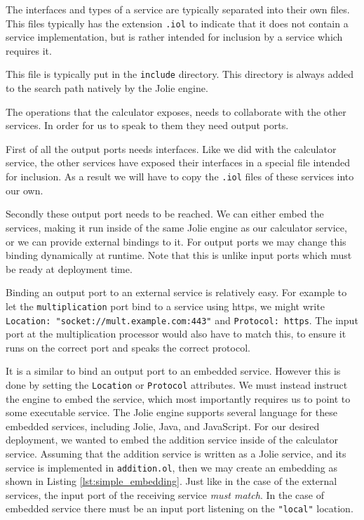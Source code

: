 \begin{observation}
    The interfaces and types of a service are typically separated into their
    own files. This files typically has the extension \verb!.iol! to indicate
    that it does not contain a service implementation, but is rather intended
    for inclusion by a service which requires it.

    This file is typically put in the \verb!include! directory. This directory
    is always added to the search path natively by the Jolie engine.
\end{observation}

The operations that the calculator exposes, needs to collaborate with the other
services. In order for us to speak to them they need output ports.

First of all the output ports needs interfaces. Like we did with the calculator
service, the other services have exposed their interfaces in a special file
intended for inclusion. As a result we will have to copy the
\texttt{.iol} files of these services into our own.

Secondly these output port needs to be reached. We can either embed the
services, making it run inside of the same Jolie engine as our calculator
service, or we can provide external bindings to it. For output ports we may
change this binding dynamically at runtime. Note that this is unlike input
ports which must be ready at deployment time.

Binding an output port to an external service is relatively easy. For example
to let the \verb!multiplication! port bind to a service using https, we might
write \texttt{Location: "socket://mult.example.com:443"} and
\texttt{Protocol: https}. The input port at the multiplication processor
would also have to match this, to ensure it runs on the correct port and speaks
the correct protocol.

It is a similar to bind an output port to an embedded service. However this is
done by setting the \texttt{Location} or \texttt{Protocol}
attributes. We must instead instruct the engine to embed the service, which
most importantly requires us to point to some executable service. The Jolie
engine supports several language for these embedded services, including Jolie,
Java, and JavaScript. For our desired deployment, we wanted to embed the
addition service inside of the calculator service. Assuming that the addition
service is written as a Jolie service, and its service is implemented in
\texttt{addition.ol}, then we may create an embedding as shown in
Listing \ref{lst:simple_embedding}. Just like in the case of the external
services, the input port of the receiving service \emph{must match}. In the
case of embedded service there must be an input port listening on the
\texttt{"local"} location.

